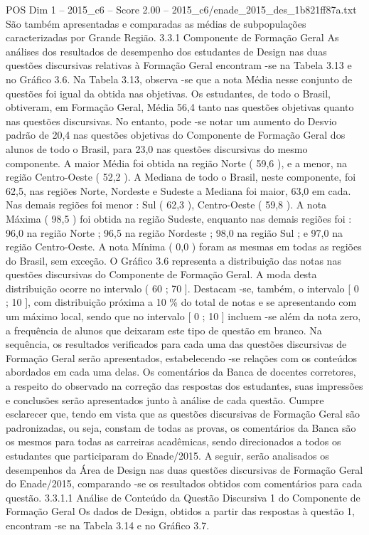 \begin{textsample}{POS Dim 1 – 2015\_c6 – Score 2.00 – 2015\_c6/enade\_2015\_des\_1b821ff87a.txt}
São também apresentadas e comparadas as médias de subpopulações caracterizadas por Grande Região. 3.3.1 Componente de Formação Geral As análises dos resultados de desempenho dos estudantes de Design nas duas questões discursivas relativas à Formação Geral encontram -se na Tabela 3.13 e no Gráfico 3.6.
Na Tabela 3.13, observa -se que a nota Média nesse conjunto de questões foi igual da obtida nas objetivas.
Os estudantes, de todo o Brasil, obtiveram, em Formação Geral, Média 56,4 tanto nas questões objetivas quanto nas questões discursivas.
No entanto, pode -se notar um aumento do Desvio padrão de 20,4 nas questões objetivas do Componente de Formação Geral dos alunos de todo o Brasil, para 23,0 nas questões discursivas do mesmo componente.
A maior Média foi obtida na região Norte ( 59,6 ), e a menor, na região Centro-Oeste ( 52,2 ).
A Mediana de todo o Brasil, neste componente, foi 62,5, nas regiões Norte, Nordeste e Sudeste a Mediana foi maior, 63,0 em cada.
Nas demais regiões foi menor : Sul ( 62,3 ), Centro-Oeste ( 59,8 ).
A nota Máxima ( 98,5 ) foi obtida na região Sudeste, enquanto nas demais regiões foi : 96,0 na região Norte ; 96,5 na região Nordeste ; 98,0 na região Sul ; e 97,0 na região Centro-Oeste.
A nota Mínima ( 0,0 ) foram as mesmas em todas as regiões do Brasil, sem exceção.
O Gráfico 3.6 representa a distribuição das notas nas questões discursivas do Componente de Formação Geral.
A moda desta distribuição ocorre no intervalo ( 60 ; 70 ].
Destacam -se, também, o intervalo [ 0 ; 10 ], com distribuição próxima a 10 \% do total de notas e se apresentando com um máximo local, sendo que no intervalo [ 0 ; 10 ] incluem -se além da nota zero, a frequência de alunos que deixaram este tipo de questão em branco.
Na sequência, os resultados verificados para cada uma das questões discursivas de Formação Geral serão apresentados, estabelecendo -se relações com os conteúdos abordados em cada uma delas.
Os comentários da Banca de docentes corretores, a respeito do observado na correção das respostas dos estudantes, suas impressões e conclusões serão apresentados junto à análise de cada questão.
Cumpre esclarecer que, tendo em vista que as questões discursivas de Formação Geral são padronizadas, ou seja, constam de todas as provas, os comentários da Banca são os mesmos para todas as carreiras acadêmicas, sendo direcionados a todos os estudantes que participaram do Enade/2015.
A seguir, serão analisados os desempenhos da Área de Design nas duas questões discursivas de Formação Geral do Enade/2015, comparando -se os resultados obtidos com comentários para cada questão. 3.3.1.1 Análise de Conteúdo da Questão Discursiva 1 do Componente de Formação Geral Os dados de Design, obtidos a partir das respostas à questão 1, encontram -se na Tabela 3.14 e no Gráfico 3.7.

\end{textsample}
